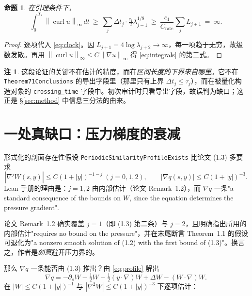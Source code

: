 \documentclass[11pt,a4paper]{ctexart}
\newtheorem{proposition}[theorem]{命题}
\theoremstyle{definition}
\newtheorem{remark}[theorem]{注}
\newcommand{\curl}{\operatorname{curl}}
\newcommand{\norm}[1]{\left\lVert #1\right\rVert}
\newcommand{\abs}[1]{\left\lvert #1\right\rvert}
\begin{document}
\begin{proposition}
在引理条件下，
\[
\int_0^{T_*}\norm{\curl u}_\infty\,dt\ \ge\ \sum_j\Delta t_j\cdot\tfrac{c_1}{2}\lambda_{j-1}^{1/8}\ \ge\ \frac{c_1}{C_{\mathrm{rate}}}\sum_j L_{j+1}\ =\ \infty .
\]
\end{proposition}

\begin{proof}
逐项代入 \eqref{eq:clock}。因 $L_{j+1}=4\log\lambda_{j+2}\to\infty$，每一项趋于无穷，故级数发散。再用 $\norm{\curl u}_\infty\le C\norm{\nabla u}_\infty$ 得 \eqref{eq:integrals} 的第二式。
\end{proof}

\begin{remark}
这段论证的关键不在估计的精度，而在\emph{区间长度的下界来自哪里}。它不在 \texttt{Theorem71Conclusions} 的导出字段里（那里只有上界 $\Delta t_j\le\tau_j$），而在被量化构造对象的 \texttt{crossing\_time} 字段中。初次审计时只看导出字段，故误判为缺口；这正是 \S\ref{sec:method} 中信息三分法的由来。
\end{remark}

\section{一处真缺口：压力梯度的衰减}\label{sec:gradq}

形式化的剖面存在性假设 \texttt{PeriodicSimilarityProfileExists} 比论文 (1.3) 多要求
\begin{equation}\label{eq:extra}
\abs{\nabla^jW(s,y)}\le C(1+\abs{y})^{-1-j}\ (j=0,1,2),\qquad \abs{\nabla q(s,y)}\le C(1+\abs{y})^{-3}.
\end{equation}
Lean 手册的理由是：$j=1,2$ 由内部估计（论文 Remark~1.2），而 $\nabla q$ 一条"a standard consequence of the bounds on $W$, since the equation determines the pressure gradient".

论文 Remark~1.2 确实覆盖 $j=1$（即 (1.3) 第二条）与 $j=2$，且明确指出所用的内部估计"requires no bound on the pressure"，并在末尾断言 Theorem~1.1 的假设可退化为"a nonzero smooth solution of (1.2) with the first bound of (1.3)"。换言之，作者是\emph{刻意}避开压力界的。

那么 $\nabla q$ 一条能否由 (1.3) 推出？由 \eqref{eq:profile} 解出
\begin{equation}\label{eq:gradq}
\nabla q=-\partial_sW-\tfrac12W-\tfrac12(y\cdot\nabla)W+\Delta W-(W\cdot\nabla)W .
\end{equation}
在 $\abs{W}\le C(1+\abs{y})^{-1}$ 与 $\abs{\nabla^2W}\le C(1+\abs{y})^{-3}$ 下逐项估计：
\end{document}
